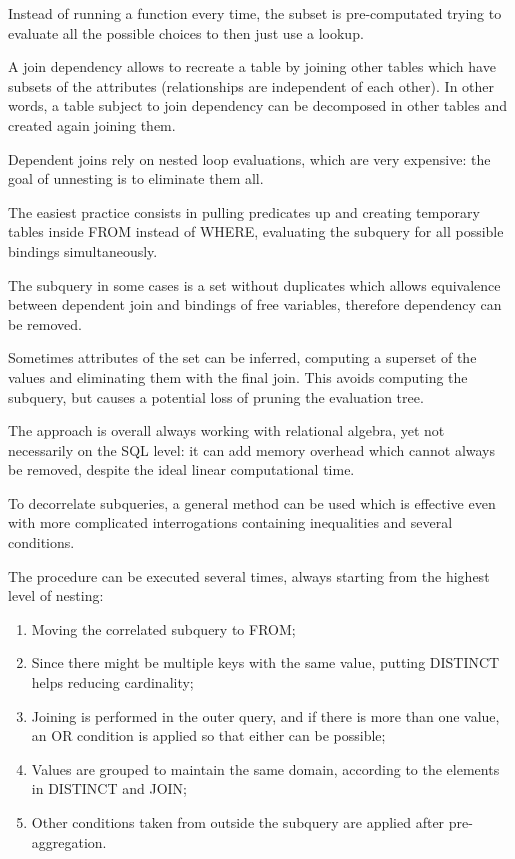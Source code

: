 Instead of running a function every time, the subset is pre-computated trying to evaluate all the possible choices to then just use a lookup.

A join dependency allows to recreate a table by joining other tables which have subsets of the attributes (relationships are independent of each other). In other words, a table subject to join dependency can be decomposed in other tables and created again joining them.

Dependent joins rely on nested loop evaluations, which are very expensive: the goal of unnesting is to eliminate them all.

The easiest practice consists in pulling predicates up and creating temporary tables inside FROM instead of WHERE, evaluating the subquery for all possible bindings simultaneously. 

The subquery in some cases is a set without duplicates which allows equivalence between dependent join and bindings of free variables, therefore dependency can be removed.

Sometimes attributes of the set can be inferred, computing a superset of the values and eliminating them with the final join. This avoids computing the subquery, but causes a potential loss of pruning the evaluation tree.

The approach is overall always working with relational algebra, yet not necessarily on the SQL level: it can add memory overhead which cannot always be removed, despite the ideal linear computational time.

To decorrelate subqueries, a general method can be used which is effective even with more complicated interrogations containing inequalities and several conditions.

The procedure can be executed several times, always starting from the highest level of nesting:
\begin{enumerate}
	\item Moving the correlated subquery to FROM;
	\item Since there might be multiple keys with the same value, putting DISTINCT helps reducing cardinality;
	\item Joining is performed in the outer query, and if there is more than one value, an OR condition is applied so that either can be possible;
	\item Values are grouped to maintain the same domain, according to the elements in DISTINCT and JOIN;
	\item Other conditions taken from outside the subquery are applied after pre-aggregation.
\end{enumerate}

